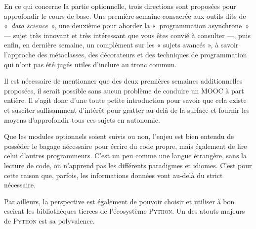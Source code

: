 %
En ce qui concerne la partie optionnelle, trois directions sont proposées pour approfondir le cours de base. Une première semaine consacrée aux outils dits de «~\textit{data science}~», une deuxième pour aborder la «~programmation asynchrone~» --- sujet très innovant et très intéressant que vous êtes convié à consulter ---, puis enfin, en dernière semaine, un complément sur les « sujets avancés », à savoir l'approche des métaclasses, des décorateurs et des techniques de programmation qui n'ont pas été jugés utiles d'inclure au tronc commun.

Il est nécessaire de mentionner que des deux premières semaines ad\-ditionnelles proposées, il serait possible sans aucun problème de conduire un MOOC à part entière. Il s'agit donc d'une toute petite introduction pour savoir que cela existe et susciter suffisamment d'intérêt pour gratter au-delà de la surface et fournir les moyens d'approfondir tous ces sujets en autonomie.

Que les modules optionnels soient suivis ou non, l'enjeu est bien entendu de posséder le bagage nécessaire pour écrire du code propre, mais également de lire celui d'autres programmeurs. C'est un peu com\-me une langue étrangère, sans la lecture de code, on n'apprend pas les différents paradigmes et idiomes. C'est pour cette raison que, parfois, les informations données vont au-delà du strict nécessaire.  

Par ailleurs, la perspective est également de pouvoir choisir et utiliser à bon escient les bibliothèques tierces de l'écosystème \textsc{Python}. Un des atouts majeurs de \textsc{Python} est sa polyvalence.

